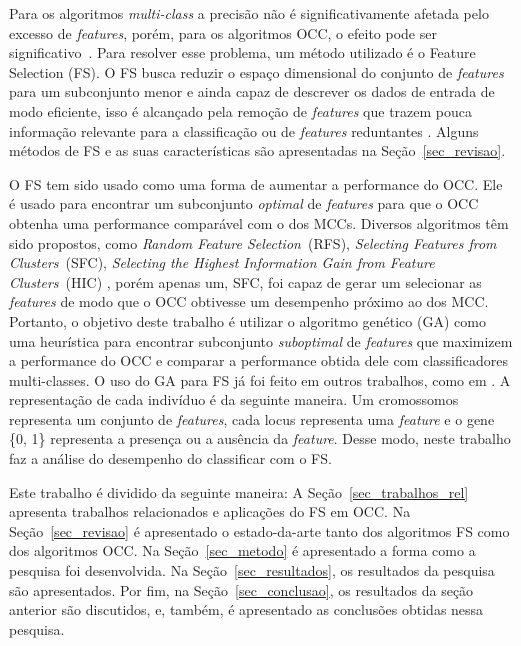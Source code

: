 \documentclass{paper}
\begin{document}
Para os algoritmos \textit{multi-class} a precisão não é significativamente
afetada pelo excesso de \textit{features}, porém, para os algoritmos OCC, o
efeito pode ser significativo~\cite{Perera2019}. Para resolver esse problema, um
método utilizado é o Feature Selection (FS).  O FS busca reduzir o espaço
dimensional do conjunto de \textit{features} para um subconjunto menor e ainda
capaz de descrever os dados de entrada de modo eficiente, isso é alcançado pela
remoção de \textit{features} que trazem pouca informação relevante para a
classificação ou de \textit{features} reduntantes \cite{Chandrashekar2014}.
Alguns métodos de FS e as suas características são apresentadas na
Seção~\ref{sec_revisao}.

O FS tem sido usado como uma forma de aumentar a performance do OCC.  Ele é
usado para encontrar um subconjunto \textit{optimal} de \textit{features} para
que o OCC obtenha uma performance comparável com o dos MCCs. Diversos algoritmos
têm sido propostos, como \textit{Random Feature Selection}~(RFS),
\textit{Selecting Features from Clusters}~(SFC), \textit{Selecting the Highest
  Information Gain from Feature Clusters}~(HIC) \cite{Khalifa2016}, porém apenas
um, SFC, foi capaz de gerar um selecionar as \textit{features} de modo que o OCC
obtivesse um desempenho próximo ao dos MCC.  Portanto, o objetivo deste trabalho
é utilizar o algoritmo genético (GA) como uma heurística para encontrar
subconjunto \textit{suboptimal} de \textit{ features} que maximizem a
performance do OCC e comparar a performance obtida dele com classificadores
multi-classes. O uso do GA para FS já foi feito em outros trabalhos, como em
\cite{Chandrashekar2014}. A representação de cada indivíduo é da seguinte
maneira. Um cromossomos representa um conjunto de \textit{features}, cada locus
representa uma \textit{feature} e o gene \{0, 1\} representa a presença ou a
ausência da \textit{feature}. Desse modo, neste trabalho faz a análise do
desempenho do classificar com o FS.

Este trabalho é dividido da seguinte maneira: A Seção~\ref{sec_trabalhos_rel}
apresenta trabalhos relacionados e aplicações do FS em OCC. Na
Seção~\ref{sec_revisao} é apresentado o estado-da-arte tanto dos algoritmos FS
como dos algoritmos OCC. Na Seção~\ref{sec_metodo} é apresentado a forma
como a pesquisa foi desenvolvida. Na Seção~\ref{sec_resultados}, os resultados
da pesquisa são apresentados. Por fim, na Seção~\ref{sec_conclusao}, os
resultados da seção anterior são discutidos, e, também, é apresentado as
conclusões obtidas nessa pesquisa.
\end{document}
